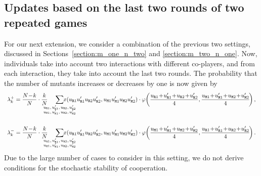 \documentclass[11pt]{article}
\def\resident{\texttt{R}}
\def\mutant{\texttt{M}}
\theoremstyle{plainCl1}
\theoremstyle{plainCl2}
\begin{document}

\subsection{Updates based on the last two rounds of two repeated games}\label{section:m_two_n_two}

For our next extension, we consider a combination of the previous two settings, discussed in Sections~\ref{section:m_one_n_two} and \ref{section:m_two_n_one}. 
Now, individuals take into account two interactions with different co-players, and from each interaction, they take into account the last two rounds. 
The probability that the number of mutants increases or decreases by one is now given by
\begin{equation}\label{eq:ratio_TwoRounds}
\begin{array}{l}
\displaystyle \lambda^+_k=\frac{N\!-\!k}{N}\cdot \frac{k}{N} 
\hspace{-0.5cm}
\sum_
{\scriptsize \begin{array}{l}
u_{\resident 1},u_{\resident 1}', u_{\resident 2},u_{\resident 2}'\\
u_{\mutant 1},u_{\mutant 1}', u_{\mutant 2},u_{\mutant 2}'
\end{array}} 
\hspace{-1cm} x(u_{\resident 1} u_{\resident 1}'u_{\resident 2} u_{\resident 2}' ,u_{\mutant 1}u_{\mutant 1}'u_{\mutant 2}u_{\mutant 2}')\cdot 
\varphi\!\left(\frac{u_{\resident 1}\!+\! u_{\resident 1}'\!+\!u_{\resident 2}\!+\!u_{\resident 2}' }{4},
\frac{u_{\mutant 1}\!+\!u_{\mutant 1}'\!+\!u_{\mutant 2}\!+\!u_{\mutant 2}'}{4}\!\right), \\[1.4cm]

\displaystyle \lambda^-_k=\frac{N\!-\!k}{N}\cdot \frac{k}{N} 
\hspace{-0.5cm}
\sum_
{\scriptsize \begin{array}{l}
u_{\resident 1},u_{\resident 1}', u_{\resident 2},u_{\resident 2}'\\
u_{\mutant 1},u_{\mutant 1}', u_{\mutant 2},u_{\mutant 2}'
\end{array}} 
\hspace{-1cm} x(u_{\resident 1} u_{\resident 1}'u_{\resident 2} u_{\resident 2}' ,u_{\mutant 1}u_{\mutant 1}'u_{\mutant 2}u_{\mutant 2}')\cdot 
\varphi\!\left(\frac{u_{\mutant 1}\!+\!u_{\mutant 1}'\!+\!u_{\mutant 2}\!+\!u_{\mutant 2}'}{4},
\frac{u_{\resident 1}\!+\! u_{\resident 1}'\!+\!u_{\resident 2}\!+\!u_{\resident 2}' }{4}\!\right).
\end{array}
\end{equation}
Due to the large number of cases to consider in this setting, we do not derive conditions for the stochastic stability of cooperation. 
\end{document}
